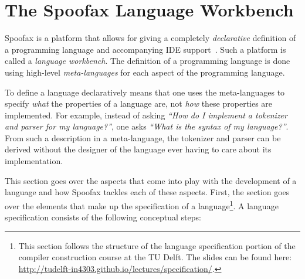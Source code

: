 \section{The Spoofax Language Workbench}
\label{sec:spoofax}

Spoofax is a platform that allows for giving a completely
\emph{declarative} definition of a programming language and accompanying
IDE support~\cite{Kats10a}. Such a platform is called a \emph{language
workbench}. The definition of a programming language is done using
high-level \emph{meta-languages} for each aspect of the programming
language.

To define a language declaratively means that one uses the
meta-languages to specify \emph{what} the properties of a language are, not
\emph{how} these properties are implemented. For example, instead of asking
\emph{​``How do I implement a tokenizer and parser for my language?''​}, one
asks \emph{​``What is the syntax of my language?''​}. From such a description
in a meta-language, the tokenizer and parser can be derived without
the designer of the language ever having to care about its
implementation.

This section goes over the aspects that come into play with the
development of a language and how Spoofax tackles each of these
aspects. First, the section goes over the elements that make up the
specification of a language\footnote{This section follows
the structure of the language specification portion of the compiler
construction course at the TU Delft. The slides can be found here:
\url{http://tudelft-in4303.github.io/lectures/specification/}.}. A language
specification consists of the following conceptual steps:

